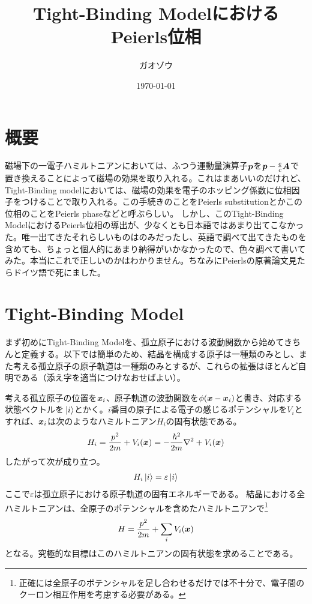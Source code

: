 \documentclass[uplatex,dvipdfmx, a4j]{jsarticle}
\title{Tight-Binding ModelにおけるPeierls位相}
\author{ガオゾウ}
\date{\today}
\renewcommand{\vec}{\vb*}
\begin{document}
\maketitle
\section{概要}
磁場下の一電子ハミルトニアンにおいては、ふつう運動量演算子$\vec{p}$を$\vec{p}-\frac{e}{c}\vec{A}$で置き換えることによって磁場の効果を取り入れる。これはまあいいのだけれど、Tight-Binding modelにおいては、磁場の効果を電子のホッピング係数に位相因子をつけることで取り入れる。この手続きのことをPeierls substitutionとかこの位相のことをPeierls phaseなどと呼ぶらしい。
しかし、このTight-Binding ModelにおけるPeierls位相の導出が、少なくとも日本語ではあまり出てこなかった。唯一出てきたそれらしいものは\cite{NagaiNote}のみだったし、英語で調べて出てきたものを含めても、ちょっと個人的にあまり納得がいかなかったので、色々調べて書いてみた。本当にこれで正しいのかはわかりません。ちなみにPeierlsの原著論文見たらドイツ語で死にました。

\section{Tight-Binding Model}
まず初めにTight-Binding Modelを、孤立原子における波動関数から始めてきちんと定義する。以下では簡単のため、結晶を構成する原子は一種類のみとし、また考える孤立原子の原子軌道は一種類のみとするが、これらの拡張はほとんど自明である（添え字を適当につけなおせばよい）。

考える孤立原子の位置を$\vec{x}_i$、原子軌道の波動関数を$\phi(\vec{x}-\vec{x}_i)$と書き、対応する状態ベクトルを$\ket*{i}$とかく。$i$番目の原子による電子の感じるポテンシャルを$V_i$とすれば、$\vec{x}_i$は次のようなハミルトニアン$H_i$の固有状態である。
\begin{align}
	H_i = \frac{p^2}{2m} + V_i(\vec{x}) = -\frac{\hbar^2}{2m}\nabla^2 + V_i(\vec{x})
\end{align}
したがって次が成り立つ。
\begin{align}
	H_i\ket{i} = \varepsilon\ket{i}
\end{align}
ここで$\varepsilon$は孤立原子における原子軌道の固有エネルギーである。
結晶における全ハミルトニアンは、全原子のポテンシャルを含めたハミルトニアンで\footnote{正確には全原子のポテンシャルを足し合わせるだけでは不十分で、電子間のクーロン相互作用を考慮する必要がある。}
\begin{align}
	H = \frac{p^2}{2m} + \sum_i V_i(\vec{x}) \label{eq:Hamiltonian}
\end{align}
となる。究極的な目標はこのハミルトニアンの固有状態を求めることである。
\end{document}
